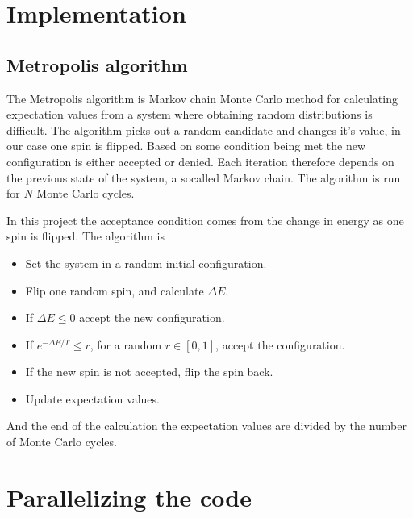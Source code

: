 \documentclass[11pt]{article}
\begin{document}
\section{Implementation}

\subsection{Metropolis algorithm} 

\begin{flushleft}
The Metropolis algorithm is Markov chain Monte Carlo method for calculating expectation values from a system where obtaining random distributions is difficult. The algorithm picks out a random candidate and changes it's value, in our case one spin is flipped. Based on some condition being met the new configuration is either accepted or denied. Each iteration therefore depends on the previous state of the system, a socalled Markov chain. The algorithm is run for $N$ Monte Carlo cycles.
\end{flushleft}

\begin{flushleft}
In this project the acceptance condition comes from the change in energy as one spin is flipped. The algorithm is 

\begin{itemize}
\item Set the system in a random initial configuration.

\item Flip one random spin, and calculate $\Delta E$.

\item If $\Delta E \leq 0$ accept the new configuration.

\item If $e^{-\Delta E/T} \leq r$, for a random $r \in [0,1]$, accept the configuration.

\item If the new spin is not accepted, flip the spin back.

\item Update expectation values.
\end{itemize}

And the end of the calculation the expectation values are divided by the number of Monte Carlo cycles.

\end{flushleft}

\section{Parallelizing the code}
\end{document}
